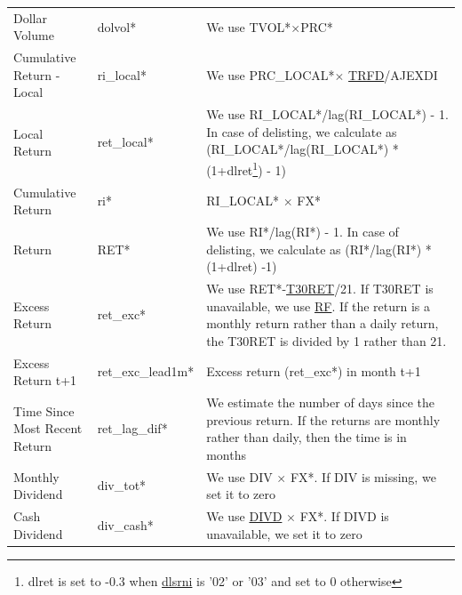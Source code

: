 \documentclass[12pt,title,fleqn]{article}
\begin{document}
{\begin{longtable}{@{\extracolsep{\fill}}|m{5cm}|l|m{8cm}|@{}}
    Dollar Volume & dolvol\mbox{*} & We use 
    TVOL\mbox{*}$\times$PRC\mbox{*}\\
    
    Cumulative Return - Local & ri\_local\mbox{*} & We use
    PRC\_LOCAL\mbox{*}$\times$ \href{https://wrds-www.wharton.upenn.edu/data-dictionary/form_metadata/comp_na_daily_all_secd_dataitems/TRFD/}{TRFD}/AJEXDI \\
    
    Local Return & ret\_local\mbox{*} & We use RI\_LOCAL\mbox{*}/lag(RI\_LOCAL\mbox{*}) - 1. In case of delisting, we calculate as (RI\_LOCAL\mbox{*}/lag(RI\_LOCAL\mbox{*}) * (1+dlret\footnote{dlret is set to -0.3 when \href{https://wrds-www.wharton.upenn.edu/data-dictionary/comp_na_daily_all/security/dlrsni/}{dlsrni} is '02' or '03' and set to 0 otherwise}) - 1)\\
    
    Cumulative Return & ri\mbox{*} & RI\_LOCAL\mbox{*} $\times$ FX\mbox{*}\\
    
    Return & RET\mbox{*} & We use RI\mbox{*}/lag(RI\mbox{*}) - 1. In case of delisting, we calculate as (RI\mbox{*}/lag(RI\mbox{*}) * (1+dlret) -1)\\
    
    Excess Return & ret\_exc\mbox{*} & We use RET\mbox{*}-\href{https://wrds-www.wharton.upenn.edu/data-dictionary/crsp_a_indexes/mcti/#row-t30ret}{T30RET}/21. If T30RET is unavailable, we use 
    \href{https://wrds-www.wharton.upenn.edu/data-dictionary/ff_all/factors_monthly/#row-rf}{RF}. If the return is a monthly return rather than a daily return, the T30RET is divided by 1 rather than 21. \\
    
    Excess Return t+1 & ret\_exc\_lead1m\mbox{*} &  Excess return (ret\_exc\mbox{*}) in month t+1 \\
    
    Time Since Most Recent Return  & ret\_lag\_dif\mbox{*} & We estimate the number of days since the previous return. If the returns are monthly rather than daily, then the time is in months\\
 
    
    Monthly Dividend & div\_tot\mbox{*} & We use DIV $\times$ FX\mbox{*}. If DIV is missing, we set it to zero\\
    
    Cash Dividend & div\_cash\mbox{*} & We use 
    \href{https://wrds-www.wharton.upenn.edu/data-dictionary/form_metadata/comp_na_daily_all_secd_dataitems/DIVD/}{DIVD} $\times$ FX\mbox{*}. If DIVD is unavailable, we set it to zero \\
    

\end{longtable}}
\end{document}
